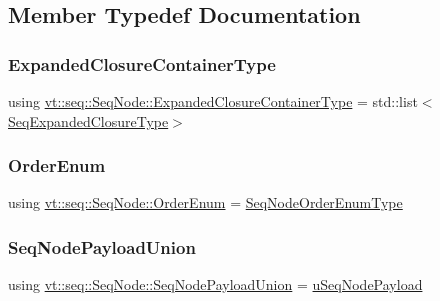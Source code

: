 \subsection{Member Typedef Documentation}
\mbox{\label{structvt_1_1seq_1_1_seq_node_aff21f386bb9bce2ce5c940edffcdb0a0}} 
\subsubsection{\texorpdfstring{Expanded\+Closure\+Container\+Type}{ExpandedClosureContainerType}}
{\footnotesize\ttfamily using \hyperlink{structvt_1_1seq_1_1_seq_node_aff21f386bb9bce2ce5c940edffcdb0a0}{vt\+::seq\+::\+Seq\+Node\+::\+Expanded\+Closure\+Container\+Type} =  std\+::list$<$\hyperlink{namespacevt_1_1seq_a322533ee3b8e3443e6808410aea39797}{Seq\+Expanded\+Closure\+Type}$>$}

\mbox{\label{structvt_1_1seq_1_1_seq_node_a1a934ba4a7da31ed1fa9c7789b8448ac}} 
\subsubsection{\texorpdfstring{Order\+Enum}{OrderEnum}}
{\footnotesize\ttfamily using \hyperlink{namespacevt_1_1seq_a313357c71bba2bea5c57f50d69f1edf7}{vt\+::seq\+::\+Seq\+Node\+::\+Order\+Enum} =  \hyperlink{namespacevt_1_1seq_a313357c71bba2bea5c57f50d69f1edf7}{Seq\+Node\+Order\+Enum\+Type}}

\mbox{\label{structvt_1_1seq_1_1_seq_node_a4550535aff445a28557a1edb9508a6bc}} 
\subsubsection{\texorpdfstring{Seq\+Node\+Payload\+Union}{SeqNodePayloadUnion}}
{\footnotesize\ttfamily using \hyperlink{structvt_1_1seq_1_1_seq_node_a4550535aff445a28557a1edb9508a6bc}{vt\+::seq\+::\+Seq\+Node\+::\+Seq\+Node\+Payload\+Union} =  \hyperlink{unionvt_1_1seq_1_1u_seq_node_payload}{u\+Seq\+Node\+Payload}}


